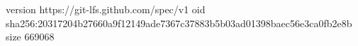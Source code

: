 version https://git-lfs.github.com/spec/v1
oid sha256:20317204b27660a9f12149ade7367c37883b5b03ad01398baec56e3ca0fb2e8b
size 669068
